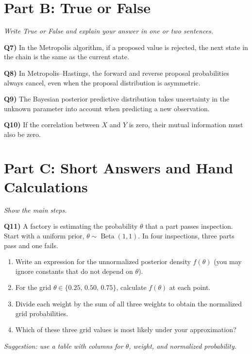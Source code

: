 \documentclass[12pt]{article}
\newcommand{\question}[2]{\vspace{0.7em}\noindent\textbf{Q#1)}}
\begin{document}
\section*{Part B: True or False}
\textit{Write True or False and explain your answer in one or two sentences.}

\question{7}{}
In the Metropolis algorithm, if a proposed value is rejected, the next state in the chain is the same as the current state.
\vspace{0.8em}

\question{8}{}
In Metropolis--Hastings, the forward and reverse proposal probabilities always cancel, even when the proposal distribution is asymmetric.
\vspace{0.8em}

\question{9}{}
The Bayesian posterior predictive distribution takes uncertainty in the unknown parameter into account when predicting a new observation.
\vspace{0.8em}

\question{10}{}
If the correlation between $X$ and $Y$ is zero, their mutual information must also be zero.
\vspace{0.8em}

\section*{Part C: Short Answers and Hand Calculations}
\textit{Show the main steps.}

\question{11}{}
A factory is estimating the probability $\theta$ that a part passes inspection. Start with a uniform prior, $\theta\sim\operatorname{Beta}(1,1)$. In four inspections, three parts pass and one fails.
\begin{enumerate}[label=(\alph*)]
\item Write an expression for the unnormalized posterior density $f(\theta)$ (you may ignore constants that do not depend on $\theta$).
\item For the grid $\theta\in\{0.25,\,0.50,\,0.75\}$, calculate $f(\theta)$ at each point.
\item Divide each weight by the sum of all three weights to obtain the normalized grid probabilities.
\item Which of these three grid values is most likely under your approximation?
\end{enumerate}
\textit{Suggestion: use a table with columns for $\theta$, weight, and normalized probability.}
\end{document}

